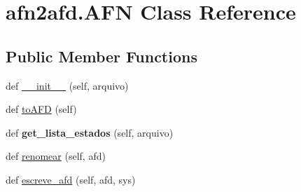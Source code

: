 \hypertarget{classafn2afd_1_1AFN}{}\section{afn2afd.\+A\+FN Class Reference}
\label{classafn2afd_1_1AFN}
\subsection*{Public Member Functions}
\begin{DoxyCompactItemize}
\item 
def \hyperlink{classafn2afd_1_1AFN_a7522a65e0a88072bd80f033a065a616d}{\+\_\+\+\_\+init\+\_\+\+\_\+} (self, arquivo)
\item 
def \hyperlink{classafn2afd_1_1AFN_a6595876ab5fcfb2ca02c94b70b7f73c2}{to\+A\+FD} (self)
\item 
def {\bfseries get\+\_\+lista\+\_\+estados} (self, arquivo)\hypertarget{classafn2afd_1_1AFN_aedc9ffb43dfb302f3e297dc9e6cc7357}{}\label{classafn2afd_1_1AFN_aedc9ffb43dfb302f3e297dc9e6cc7357}

\item 
def \hyperlink{classafn2afd_1_1AFN_a77270715bb9430bf0137168354d317a0}{renomear} (self, afd)
\item 
def \hyperlink{classafn2afd_1_1AFN_ac5c9d7cb93f7de2669ed0f63dde5df87}{escreve\+\_\+afd} (self, afd, sys)
\end{DoxyCompactItemize}
